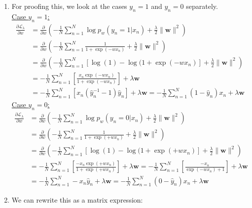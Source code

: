 \documentclass[12pt]{article}
\begin{document}
\begin{enumerate}
	\item For proofing this, we look at the cases $y_n=1$ and $y_n = 0$ separately.\\
	\noindent
	\underline{Case $y_n = 1$:}
	\begin{align*}
	\frac{\partial \mathcal{L}_\lambda}{\partial w} &= \frac{\partial}{\partial w} \left( -\frac{1}{N} \sum_{n=1}^{N} \log p_w (y_n = 1|x_n) + \frac{\lambda}{2}\lVert \textbf{w} \rVert^2  \right) \\
	&= \frac{\partial}{\partial w} \left( -\frac{1}{N} \sum_{n=1}^{N} \frac{1}{1+\exp(-wx_n)} + \frac{\lambda}{2}\lVert \textbf{w} \rVert^2  \right) \\
	&= \frac{\partial}{\partial w} \left( -\frac{1}{N} \sum_{n=1}^{N} \left[\log(1)-\log(1+\exp(-wx_n) \right] + \frac{\lambda}{2}\lVert \textbf{w} \rVert^2  \right) \\
	&= -\frac{1}{N} \sum_{n=1}^{N} \left[ \frac{x_n \exp(-wx_n)}{1+\exp(-wx_n)} \right] + \lambda\textbf{w}   \\
	&= -\frac{1}{N} \sum_{n=1}^{N} \left[ x_n(\hat{y}_n^{-1}-1)\hat{y}_n \right] + \lambda\textbf{w} = 
	-\frac{1}{N} \sum_{n=1}^{N} (1- \hat{y}_n)x_n + \lambda\textbf{w} 
	\end{align*}
	\underline{Case $y_n = 0$:}
	\begin{align*}
	\frac{\partial \mathcal{L}_\lambda}{\partial w} &= \frac{\partial}{\partial w} \left( -\frac{1}{N} \sum_{n=1}^{N} \log p_w (y_n = 0|x_n) + \frac{\lambda}{2}\lVert \textbf{w} \rVert^2  \right) \\
	&= \frac{\partial}{\partial w} \left( -\frac{1}{N} \sum_{n=1}^{N} \frac{1}{1+\exp(+wx_n)} + \frac{\lambda}{2}\lVert \textbf{w} \rVert^2  \right) \\
	&= \frac{\partial}{\partial w} \left( -\frac{1}{N} \sum_{n=1}^{N} \left[\log(1)-\log(1+\exp(+wx_n) \right] + \frac{\lambda}{2}\lVert \textbf{w} \rVert^2  \right) \\
	&= -\frac{1}{N} \sum_{n=1}^{N} \left[ \frac{-x_n \exp(+wx_n)}{1+\exp(+wx_n)} \right] + \lambda\textbf{w}   
	= -\frac{1}{N} \sum_{n=1}^{N} \left[ \frac{-x_n }{\exp(-wx_n)+1} \right] + \lambda\textbf{w}   \\
	&= -\frac{1}{N} \sum_{n=1}^{N}  -x_n\hat{y}_n + \lambda\textbf{w} = 
	-\frac{1}{N} \sum_{n=1}^{N} (0- \hat{y}_n)x_n + \lambda\textbf{w} 
	\end{align*}
	\item We can rewrite this as a matrix expression:
	\begin{align*}

\end{align*}
\end{enumerate}
\end{document}
